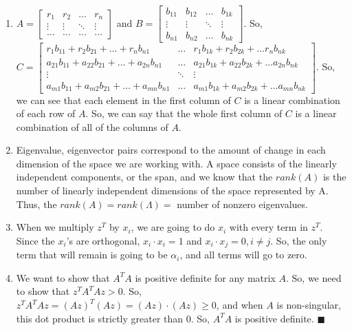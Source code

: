 \documentclass{article}
\newcommand*{\qed}{\hfill\ensuremath{\blacksquare}}
\begin{document}
\begin{enumerate}
\item $A = 
\begin{bmatrix}
r_1	&r_2	&\dots	&r_n\\
\vdots	&\vdots	&\ddots	&\vdots\\
\dots	&\dots	&\dots	&\dots	
\end{bmatrix}
$ and $B = 
\begin{bmatrix}
b_{11}	&b_{12}	&\dots	&b_{1k}\\
\vdots	&\vdots	&\ddots	&\vdots\\
b_{n1}	&b_{n2}	&\dots	&b_{nk}
\end{bmatrix}
$. So, \\
$C = 
\begin{bmatrix}
r_1b_{11} + r_2b_{21} + \dots + r_nb_{n1}	&\dots	&r_1b_{1k} + r_2b_{2k} + \dots r_nb_{nk}\\
a_{21}b_{11} + a_{22}b_{21} + \dots + a_{2n}b_{n1}	&\dots	&a_{21}b_{1k} + a_{22}b_{2k} + \dots a_{2n}b_{nk}\\
\vdots		&\ddots	&\vdots\\
a_{m1}b_{11} + a_{m2}b_{21} + \dots + a_{mn}b_{n1}	&\dots	&a_{m1}b_{1k} + a_{m2}b_{2k} + \dots a_{mn}b_{nk}
\end{bmatrix}
$. So, we can see that each element in the first column of $C$ is a linear combination of each row of $A$. So, we can say that the whole first column of $C$ is a linear combination of all of the columns of $A$. 

\item Eigenvalue, eigenvector pairs correspond to the amount of change in each dimension of the space we are working with. A space consists of the linearly independent components, or the span, and we know that the $rank(A)$ is the number of linearly independent dimensions of the space represented by A. Thus, the $rank(A) = rank(\Lambda) = $ number of nonzero eigenvalues. 

\item When we multiply $z^T$ by $x_i$, we are going to do $x_i$ with every term in $z^T$. Since the $x_i$'s are orthogonal, $x_i \cdot x_i = 1$ and $x_i \cdot x_j = 0, i \neq j$. So, the only term that will remain is going to be $\alpha_i$, and all terms will go to zero. 

\item We want to show that $A^TA$ is positive definite for any matrix $A$. So, we need to show that $z^TA^TAz > 0$. So, \\
$z^TA^TAz = (Az)^T(Az) = (Az)\cdot(Az) \geq 0$, and when $A$ is non-singular, this dot product is strictly greater than 0. So, $A^TA$ is positive definite. \qed


\end{enumerate}
\end{document}
